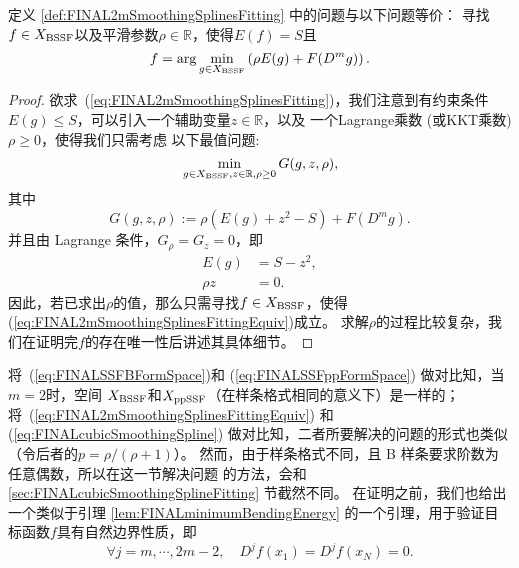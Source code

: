 \begin{thm}
  \label{thm:FINAL2mSmoothingSplinesFittingEquiv}
  定义 \ref{def:FINAL2mSmoothingSplinesFitting} 中的问题与以下问题等价：
  寻找$f\in  X_{\textnormal{BSSF}}$以及平滑参数$\rho\in \mathbb{R}$，使得$E(f)=S$且
  \begin{equation}
    \label{eq:FINAL2mSmoothingSplinesFittingEquiv}
    f = \arg \min_{g\in  X_{\textnormal{BSSF}}} \left( \rho E(g)+F(D^{m}g) \right).
  \end{equation}
\end{thm}
\begin{proof}
  欲求~(\ref{eq:FINAL2mSmoothingSplinesFitting})，我们注意到有约束条件
  $E(g)\le S$，可以引入一个辅助变量$z\in \mathbb{R}$，以及
  一个Lagrange乘数 (或KKT乘数) $\rho\ge0$，使得我们只需考虑
  以下最值问题:
  \begin{displaymath}
    \min_{g\in  X_{\textnormal{BSSF}},z\in \mathbb{R},\rho\ge 0}G(g,z,\rho),
  \end{displaymath}
  其中
  \begin{displaymath}
    G(g,z,\rho):=\rho(E(g)+z^{2}-S)+F(D^{m}g).
  \end{displaymath}
  并且由 Lagrange 条件，$G_{\rho}=G_{z}=0$，即
  \begin{displaymath}
    \begin{aligned}
      E(g)&=S-z^{2}, \\
      \rho z&=0.
    \end{aligned}
  \end{displaymath}
  因此，若已求出$\rho$的值，那么只需寻找$f\in X_{\textnormal{BSSF}}$，使得
  (\ref{eq:FINAL2mSmoothingSplinesFittingEquiv})成立。
  求解$\rho$的过程比较复杂，我们在证明完$f$的存在唯一性后讲述其具体细节。
\end{proof}

将~(\ref{eq:FINALSSFBFormSpace})和
(\ref{eq:FINALSSFppFormSpace}) 做对比知，当 $m=2$时，空间
$X_{\textnormal{BSSF}}$和$X_{\textnormal{ppSSF}}$（在样条格式相同的意义下）是一样的；
将~(\ref{eq:FINAL2mSmoothingSplinesFittingEquiv}) 和
(\ref{eq:FINALcubicSmoothingSpline}) 做对比知，二者所要解决的问题的形式也类似
（令后者的$p=\rho/(\rho+1)$）。
然而，由于样条格式不同，且 B 样条要求阶数为任意偶数，所以在这一节解决问题
的方法，会和 \ref{sec:FINALcubicSmoothingSplineFitting} 节截然不同。
在证明之前，我们也给出一个类似于引理 \ref{lem:FINALminimumBendingEnergy}
的一个引理，用于验证目标函数$f$具有自然边界性质，即
\begin{equation}
  \label{eq:FINALnaturalOrder2m}
  \forall j=m,\cdots,2m-2,\quad
    D^{j}f(x_{1})=D^{j}f(x_{N})=0.
  \end{equation}

